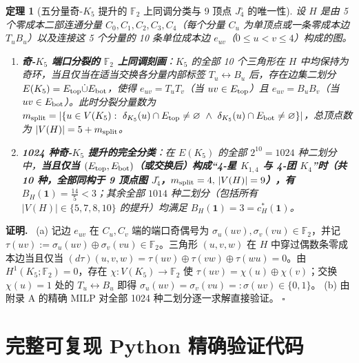 \documentclass[11pt,a4paper]{ctexart}
\newtheorem{theorem}{定理}[section]
\theoremstyle{definition}
\newenvironment{proofcn}{\par\noindent\textbf{证明.}\ }{\hfill$\square$\par}
\newcommand{\FF}{\mathbb F}
\newcommand{\1}{\boldsymbol 1}
\newcommand{\0}{\boldsymbol 0}
\begin{document}
\begin{theorem}[五分量奇-$K_5$ 提升的 $\FF_2$ 上同调分类与 9 顶点 $J_4^\circ$ 的唯一性]\label{thm:odd_K5_classification}
设 $H$ 是由 5 个零成本二部连通分量 $C_0,C_1,C_2,C_3,C_4$（每个分量 $C_u$ 为单顶点或一条零成本边 $T_uB_u$）以及连接这 5 个分量的 10 条单位成本边 $e_{uv}$（$0\le u<v\le 4$）构成的图。
\begin{enumerate}[label=(\alph*)]
\item \textbf{奇-$K_5$ 端口分裂的 $\FF_2$ 上同调刻画}：$K_5$ 的全部 10 个三角形在 $H$ 中均保持为奇环，当且仅当在适当交换各分量内部标签 $T_u\leftrightarrow B_u$ 后，存在边集二划分 $E(K_5)=E_{\rm top}\dot\cup E_{\rm bot}$，使得 $e_{uv}=T_uT_v$（当 $uv\in E_{\rm top}$）且 $e_{uv}=B_uB_v$（当 $uv\in E_{\rm bot}$）。此时分裂分量数为 $m_{\rm split}=|\{u\in V(K_5):\ \delta_{K_5}(u)\cap E_{\rm top}\neq\varnothing\ \land\ \delta_{K_5}(u)\cap E_{\rm bot}\neq\varnothing\}|$，总顶点数为 $|V(H)|=5+m_{\rm split}$。
\item \textbf{1024 种奇-$K_5$ 提升的完全分类}：在 $E(K_5)$ 的全部 $2^{10}=1024$ 种二划分中，\textbf{当且仅当 $(E_{\rm top},E_{\rm bot})$（或交换后）构成“4-星 $K_{1,4}$ 与 4-团 $K_4$”时（共 10 种，全部同构于 9 顶点图 $J_4^\circ$，$m_{\rm split}=4,\,|V(H)|=9$），有 $B_H(\1)=\frac{14}{5}<3$}；其余全部 $1014$ 种二划分（包括所有 $|V(H)|\in\{5,7,8,10\}$ 的提升）均满足 $B_H(\1)=3=c_H^*(\1)$。
\end{enumerate}
\end{theorem}
\begin{proofcn}
(a) 记边 $e_{uv}$ 在 $C_u,C_v$ 端的端口奇偶号为 $\sigma_u(uv),\sigma_v(vu)\in\FF_2$，并记 $\tau(uv):=\sigma_u(uv)\oplus\sigma_v(vu)\in\FF_2$。三角形 $(u,v,w)$ 在 $H$ 中穿过偶数条零成本边当且仅当 $(d\tau)(u,v,w)=\tau(uv)\oplus\tau(vw)\oplus\tau(wu)=0$。由 $H^1(K_5;\FF_2)=0$，存在 $\chi:V(K_5)\to\FF_2$ 使 $\tau(uv)=\chi(u)\oplus\chi(v)$；交换 $\chi(u)=1$ 处的 $T_u\leftrightarrow B_u$ 即得 $\sigma_u(uv)=\sigma_v(vu)=:\sigma(uv)\in\{0,1\}$。
(b) 由附录 A 的精确 MILP 对全部 1024 种二划分逐一求解直接验证。
\end{proofcn}

\newpage
\appendix
\section{完整可复现 Python 精确验证代码}
\end{document}

